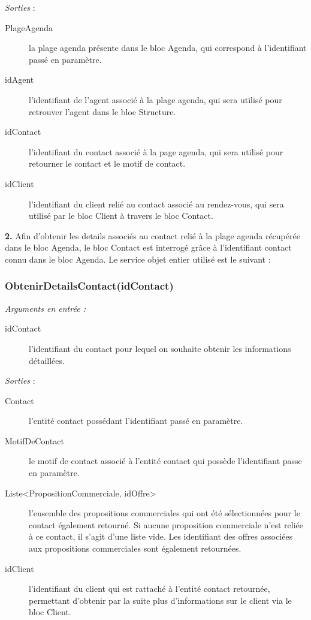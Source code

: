 \noindent \textit{Sorties} : 
\begin{description}
\item[PlageAgenda] la plage agenda présente dans le bloc Agenda, qui correspond à l'identifiant passé en paramètre. 
\item[idAgent] l'identifiant de l'agent associé à la plage agenda, qui sera utilisé pour retrouver l'agent dans le bloc Structure. 
\item[idContact] l'identifiant du contact associé à la page agenda, qui sera utilisé pour retourner le contact et le motif de contact.
\item[idClient] l'identifiant du client relié au contact associé au rendez-vous, qui sera utilisé par le bloc Client à travers le bloc Contact. \\
\end{description}

\begin{shaded}
\textbf{2.} Afin d'obtenir les details associés au contact relié à la plage agenda récupérée dans le bloc Agenda,  le bloc Contact est interrogé grâce à l'identifiant contact connu dans le bloc Agenda. Le service objet entier utilisé est le suivant :
\end{shaded}

\subsubsection{ObtenirDetailsContact(idContact)}

\noindent \textit{Arguments en entrée :}
\begin{description}
\item[idContact] l'identifiant du contact pour lequel on souhaite obtenir les informations détaillées. \\
\end{description}

\noindent \textit{Sorties} :
\begin{description}
\item[Contact] l'entité contact possédant l'identifiant passé en paramètre. 
\item[MotifDeContact] le motif de contact associé à l'entité contact qui possède l'identifiant passe en paramètre. 
\item[Liste<PropositionCommerciale, idOffre>] l'ensemble des propositions commerciales qui ont été sélectionnées pour le contact également retourné. Si aucune proposition commerciale n'est reliée à ce contact, il s'agit d'une liste vide. Les identifiant des offres associées aux propositions commerciales sont également retournées. 
\item[idClient] l'identifiant du client qui est rattaché à l'entité contact retournée, permettant d'obtenir par la suite plus d'informations sur le client via le bloc Client. \\
\end{description}

